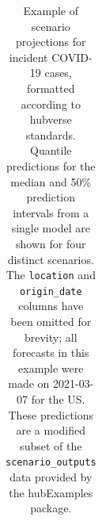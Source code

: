 \documentclass[
  letterpaper,
  DIV=11,
  numbers=noendperiod]{scrartcl}
\begin{document}
\begin{longtable}[]{@{}
  >{\raggedright\arraybackslash}p{}
  >{\raggedright\arraybackslash}p{}
  >{\raggedleft\arraybackslash}p{}
  >{\raggedright\arraybackslash}p{}
  >{\raggedright\arraybackslash}p{}
  >{\raggedleft\arraybackslash}p{}
  >{\raggedleft\arraybackslash}p{}@{}}

\caption{\label{tbl-example-scenarios}Example of scenario projections
for incident COVID-19 cases, formatted according to hubverse standards.
Quantile predictions for the median and 50\% prediction intervals from a
single model are shown for four distinct scenarios. The
\texttt{location} and \texttt{origin\_date} columns have been omitted
for brevity; all forecasts in this example were made on 2021-03-07 for
the US. These predictions are a modified subset of the
\texttt{scenario\_outputs} data provided by the {hubExamples} package.}

\tabularnewline


\end{longtable}
\end{document}
